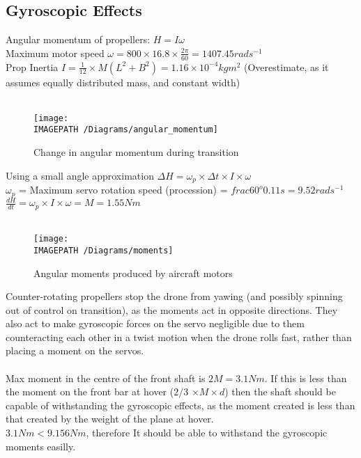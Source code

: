 \subsection{Gyroscopic Effects}
\label{sec:gyro}
Angular momentum of propellers: $H = I\omega$\\
Maximum motor speed $\omega = 800\times16.8\times\frac{2\pi}{60} = 1407.45rads^{-1}$\\
Prop Inertia $I = \frac{1}{12}\times M(L^2+B^2) = 1.16\times10^{-4}kgm^2$ (Overestimate, as it assumes equally distributed mass, and constant width)\\\\

\begin{figure}[!ht]
	\centering
	\texttt{[image: \\IMAGEPATH /Diagrams/angular\_momentum]}
	\caption{Change in angular momentum during transition}
	\label{fig:momentum}
\end{figure}

Using a small angle approximation $\Delta H = \omega_p \times\Delta t \times I \times \omega$\\ 
$\omega_p$ = Maximum servo rotation speed (procession) = $frac{60^o}{0.11s} = 9.52rads^{-1}$\\
$\frac{dH}{dt} = \omega_p \times I \times \omega = M = 1.55Nm$\\\\

\begin{figure}[!ht]
	\centering
	\texttt{[image: \\IMAGEPATH /Diagrams/moments]}
	\caption{Angular moments produced by aircraft motors}
	\label{fig:moments}
\end{figure}

 Counter-rotating propellers stop the drone from yawing (and possibly spinning out of control on transition), as the moments act in opposite directions. They also act to make gyroscopic forces on the servo negligible due to them counteracting each other in a twist motion when the drone rolls fast, rather than placing a moment on the servos.\\\\
Max moment in the centre of the front shaft is $2M = 3.1Nm$. If this is less than the moment on the front bar at hover ($2/3$ $\times M \times d$) then the shaft should be capable of withstanding the gyroscopic effects, as the moment created is less than that created by the weight of the plane at hover.\\

$3.1Nm < 9.156Nm$, therefore It should be able to withstand the gyroscopic moments easilly.


